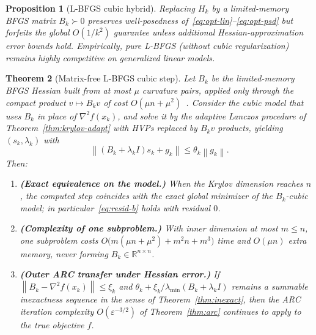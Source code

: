 \documentclass[11pt,a4paper]{article}
\newtheorem{theorem}{Theorem}[section]
\newtheorem{proposition}[theorem]{Proposition}
\newcommand{\R}{\mathbb{R}}
\newcommand{\norm}[1]{\left\|#1\right\|}
\newcommand{\hess}{\nabla^{2}}
\begin{document}
\begin{proposition}[L-BFGS cubic hybrid]
\label{prop:lbfgs}
Replacing $H_{k}$ by a limited-memory BFGS matrix $B_{k}\succ 0$ preserves well-posedness of~\eqref{eq:opt-lin}--\eqref{eq:opt-psd} but forfeits the global $O(1/k^{2})$ guarantee unless additional Hessian-approximation error bounds hold.
Empirically, pure L-BFGS (without cubic regularization) remains highly competitive on generalized linear models.
\end{proposition}

\begin{theorem}[Matrix-free L-BFGS cubic step]
\label{thm:mf-qn}
Let $B_{k}$ be the limited-memory BFGS Hessian built from at most $\mu$ curvature pairs, applied only through the compact product $v\mapsto B_{k}v$ of cost $O(\mu n+\mu^{2})$~\cite{byrd1994representationsations}.
Consider the cubic model that uses $B_{k}$ in place of $\hess f(x_{k})$, and solve it by the adaptive Lanczos procedure of Theorem~\ref{thm:krylov-adapt} with HVPs replaced by $B_{k}v$ products, yielding $(s_{k},\lambda_{k})$ with
\begin{equation}
\label{eq:resid-b}
\norm{(B_{k}+\lambda_{k}I)s_{k}+g_{k}}
\le
\theta_{k}\norm{g_{k}}.
\end{equation}
Then:
\begin{enumerate}[leftmargin=*,itemsep=1pt]
  \item \textbf{(Exact equivalence on the model.)}
  When the Krylov dimension reaches $n$, the computed step coincides with the exact global minimizer of the $B_{k}$-cubic model; in particular~\eqref{eq:resid-b} holds with residual $0$.
  \item \textbf{(Complexity of one subproblem.)}
  With inner dimension at most $m\le n$, one subproblem costs
  $O\bigl(m(\mu n+\mu^{2})+m^{2}n+m^{3}\bigr)$ time and $O(\mu n)$ extra memory, never forming $B_{k}\in\R^{n\times n}$.
  \item \textbf{(Outer ARC transfer under Hessian error.)}
  If $\norm{B_{k}-\hess f(x_{k})}\le\xi_{k}$ and $\theta_{k}+\xi_{k}/\lambda_{\min}(B_{k}+\lambda_{k}I)$ remains a summable inexactness sequence in the sense of Theorem~\ref{thm:inexact}, then the ARC iteration complexity $O(\varepsilon^{-3/2})$ of Theorem~\ref{thm:arc} continues to apply to the true objective $f$.
\end{enumerate}
\end{theorem}
\end{document}
